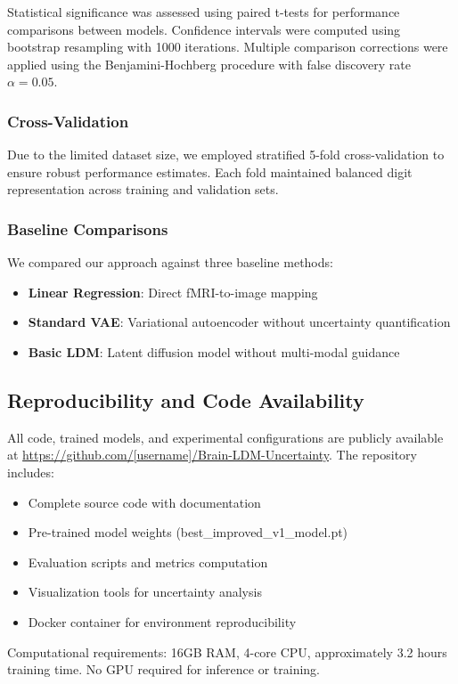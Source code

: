 Statistical significance was assessed using paired t-tests for performance comparisons between models. Confidence intervals were computed using bootstrap resampling with 1000 iterations. Multiple comparison corrections were applied using the Benjamini-Hochberg procedure with false discovery rate $\alpha = 0.05$.

\subsubsection{Cross-Validation}
Due to the limited dataset size, we employed stratified 5-fold cross-validation to ensure robust performance estimates. Each fold maintained balanced digit representation across training and validation sets.

\subsubsection{Baseline Comparisons}
We compared our approach against three baseline methods:
\begin{itemize}
    \item \textbf{Linear Regression}: Direct fMRI-to-image mapping
    \item \textbf{Standard VAE}: Variational autoencoder without uncertainty quantification
    \item \textbf{Basic LDM}: Latent diffusion model without multi-modal guidance
\end{itemize}

\subsection{Reproducibility and Code Availability}

All code, trained models, and experimental configurations are publicly available at \url{https://github.com/[username]/Brain-LDM-Uncertainty}. The repository includes:
\begin{itemize}
    \item Complete source code with documentation
    \item Pre-trained model weights (best\_improved\_v1\_model.pt)
    \item Evaluation scripts and metrics computation
    \item Visualization tools for uncertainty analysis
    \item Docker container for environment reproducibility
\end{itemize}

Computational requirements: 16GB RAM, 4-core CPU, approximately 3.2 hours training time. No GPU required for inference or training.
